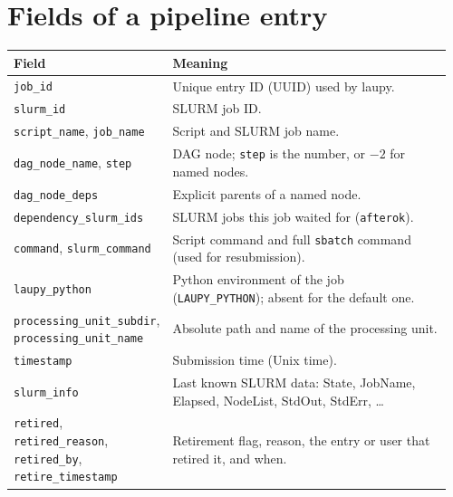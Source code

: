 \documentclass[11pt,a4paper]{article}
\newcommand{\cmd}[1]{\texttt{#1}}
\begin{document}
\appendix

\section{Fields of a pipeline entry}\label{app:fields}

\begin{longtable}{@{}>{\raggedright}p{0.3\linewidth}>{\raggedright\arraybackslash}p{0.66\linewidth}@{}}
\toprule
Field & Meaning \\
\midrule
\endhead
\cmd{job\_id} & Unique entry ID (UUID) used by laupy. \\
\cmd{slurm\_id} & SLURM job ID. \\
\cmd{script\_name}, \cmd{job\_name} & Script and SLURM job name. \\
\cmd{dag\_node\_name}, \cmd{step} & DAG node; \cmd{step} is the number, or $-2$ for named nodes. \\
\cmd{dag\_node\_deps} & Explicit parents of a named node. \\
\cmd{dependency\_slurm\_ids} & SLURM jobs this job waited for (\cmd{afterok}). \\
\cmd{command}, \cmd{slurm\_command} & Script command and full \cmd{sbatch} command (used for resubmission). \\
\cmd{laupy\_python} & Python environment of the job (\cmd{LAUPY\_PYTHON}); absent for the default one. \\
\cmd{processing\_unit\_subdir}, \cmd{processing\_unit\_name} & Absolute path and name of the processing unit. \\
\cmd{timestamp} & Submission time (Unix time). \\
\cmd{slurm\_info} & Last known SLURM data: State, JobName, Elapsed, NodeList, StdOut, StdErr, \ldots \\
\cmd{retired}, \cmd{retired\_reason}, \cmd{retired\_by}, \cmd{retire\_timestamp} & Retirement flag, reason, the entry or user that retired it, and when. \\
\bottomrule
\end{longtable}
\end{document}
